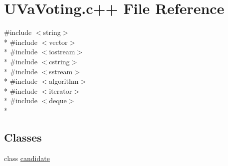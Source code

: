 \hypertarget{UVaVoting_8c_09_09}{\section{U\-Va\-Voting.\-c++ File Reference}
\label{UVaVoting_8c_09_09}
}
{\ttfamily \#include $<$string$>$}\\*
{\ttfamily \#include $<$vector$>$}\\*
{\ttfamily \#include $<$iostream$>$}\\*
{\ttfamily \#include $<$cstring$>$}\\*
{\ttfamily \#include $<$sstream$>$}\\*
{\ttfamily \#include $<$algorithm$>$}\\*
{\ttfamily \#include $<$iterator$>$}\\*
{\ttfamily \#include $<$deque$>$}\\*
\subsection*{Classes}
\begin{DoxyCompactItemize}
\item 
class \hyperlink{classcandidate}{candidate}
\end{DoxyCompactItemize}
